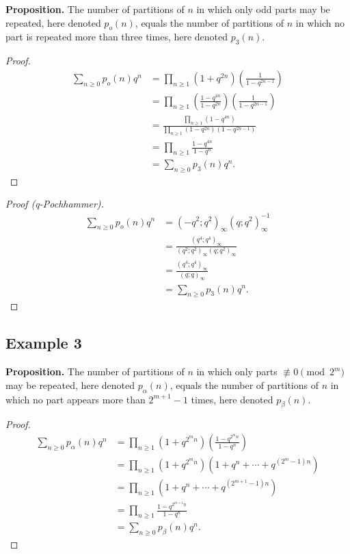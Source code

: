 \textbf{Proposition.}
The number of partitions of $n$ in which only odd parts may be repeated, here denoted $p_o(n)$,
equals the number of partitions of $n$ in which no part is repeated more than three times,
here denoted $p_3(n)$.

\begin{proof}
    \begin{align*}
        \sum_{n\ge 0} p_o(n)q^n&=\prod_{n\ge 1}\left(1+q^{2n}\right)\left(\frac{1}{1-q^{2n-1}}\right)\\[0.5em]
        &=\prod_{n\ge 1}\left(\frac{1-q^{4n}}{1-q^{2n}}\right)\left(\frac{1}{1-q^{2n-1}}\right)\\[0.5em]
        &=\frac{\prod_{n\ge1}(1-q^{4n})}{\prod_{n\ge 1}(1-q^{2n})(1-q^{2n-1})}\\[0.5em]
        &=\prod_{n\ge 1}\frac{1-q^{4n}}{1-q^n}\\[0.5em]
        &=\sum_{n\ge 0}p_3(n)q^n.
    \end{align*}
\end{proof}

\begin{proof}[Proof (q-Pochhammer)]
        \begin{align*}
            \sum_{n\ge 0} p_o(n)q^n &= (-q^2;q^2)_\infty (q;q^2)_\infty^{-1} \\
            &= \frac{(q^4;q^4)_\infty}{(q^2;q^2)_\infty (q;q^2)_\infty} \\[0.75em]
            &= \frac{(q^4;q^4)_\infty}{(q;q)_\infty} \\[0.75em]
            &= \sum_{n\ge 0} p_3(n)q^n.
        \end{align*}
\end{proof}

\newpage

\subsection*{Example 3}\label{subsec:example-3}

\textbf{Proposition.}
The number of partitions of $n$ in which only parts $\not\equiv 0 \pmod{2^m}$ may
be repeated, here denoted $p_\alpha(n)$, equals the number of partitions of $n$ in which no part appears
more than $2^{m+1}-1$ times, here denoted $p_\beta(n)$.

\begin{proof}
    \begin{align*}
        \sum_{n\ge 0}p_\alpha(n)q^n &= \prod_{n\ge 1}\left(1+q^{2^m n}\right)\left(\frac{1-q^{2^mn}}{1-q^n}\right)\\[0.5em]
        &= \prod_{n\ge 1} \left(1+q^{2^mn}\right) \left(1+q^n+\cdots+q^{(2^m-1)n}\right)\\[0.5em]
        &= \prod_{n\ge 1} \left(1+q^n+\cdots+q^{(2^{m+1}-1)n}\right)\\[0.5em]
        &= \prod_{n\ge 1} \frac{1-q^{2^{m+1}n}}{1-q^n}\\[0.5em]
        &= \sum_{n\ge 0} p_\beta(n)q^n.
    \end{align*}
\end{proof}

